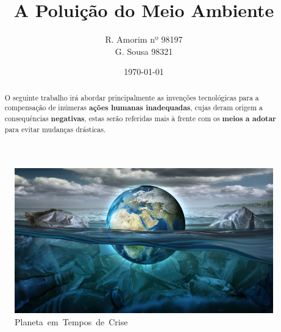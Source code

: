 \documentclass[letterpaper,12pt]{article}
\begin{document}
\title{\huge A Poluição do Meio Ambiente}
\author{R. Amorim nº 98197\\ G. Sousa 98321}
\date{\today}
\maketitle
\begin{figure}[h]
    \centering
    \includegraphics{PlanetaPlastico.jpg}
    \caption{\hbox{Planeta em Tempos de Crise}}
    \label{capa}
\end{figure}
\begin{abstract}
\centering
O seguinte trabalho irá abordar principalmente as invenções tecnológicas para a compensação de inúmeras \textbf{ações humanas inadequadas}, cujas deram origem a consequências \textbf{negativas}, estas serão referidas mais à frente com os \textbf{meios a adotar} para evitar mudanças drásticas.
\end{abstract}
\newpage
\renewcommand{\contentsname}{Índice}
\tableofcontents

\listoffigures

\listoftables

\newpage
\end{document}
